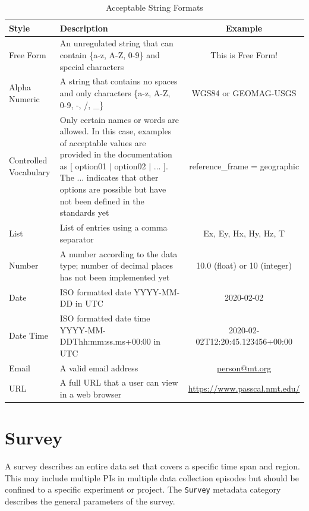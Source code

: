 \documentclass[12pt]{article}
\begin{document}
\begin{table}[hb!]
	\centering
	\caption[Acceptable String Formats]{Acceptable String Formats}
	\begin{tabular}{>{\raggedright}p{.9in}>{\raggedright}p{3.2in}c}
		\toprule
		\textbf{Style} & \textbf{Description}  & \textbf{Example} \\ \midrule
		Free Form & An unregulated string that can contain \{a-z, A-Z, 0-9\} and special characters & This is Free Form! \\ \midrule
		
		Alpha Numeric & A string that contains no spaces and only characters \{a-z, A-Z, 0-9, -, /, \_\} & WGS84 or GEOMAG-USGS \\ \midrule
		Controlled Vocabulary & Only certain names or words are allowed. In this case, examples of acceptable values are provided in the documentation as [ option01 $|$ option02 $|$ ... ]. The ... indicates that other options are possible but have not been defined in the standards yet &  reference\_frame = geographic \\ \midrule
		List & List of entries using a comma separator & Ex, Ey, Hx, Hy, Hz, T \\ \midrule
		Number & A number according to the data type; number of decimal places has not been implemented yet & 10.0 (float) or 10 (integer) \\ \midrule
		Date & ISO formatted date YYYY-MM-DD in UTC & 2020-02-02 \\ \midrule
		Date Time & ISO formatted date time YYYY-MM-DDThh:mm:ss.ms+00:00 in UTC & 2020-02-02T12:20:45.123456+00:00 \\ \midrule
		Email & A valid email address & \url{person@mt.org} \\ \midrule
		URL & A full URL that a user can view in a web browser  &  \url{https://www.passcal.nmt.edu/} \\ \bottomrule
		
		
	\end{tabular}
	\label{tab:values}
\end{table}

\clearpage
\newpage
\section{Survey}

A survey describes an entire data set that covers a specific time span and region. This may include multiple PIs in multiple data collection episodes but should be confined to a specific experiment or project. The \verb|Survey| metadata category describes the general parameters of the survey.
\end{document}
